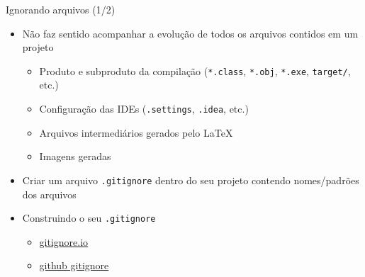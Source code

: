 \documentclass[14pt]{beamer}
\begin{document}
\begin{frame}{Ignorando arquivos (1/2)}
    \begin{itemize}
        \item Não faz sentido acompanhar a evolução de todos os arquivos
        contidos em um projeto
        \begin{itemize}
            \item Produto e subproduto da compilação (\texttt{*.class},
            \texttt{*.obj}, \texttt{*.exe}, \texttt{target/}, etc.)
            \item Configuração das IDEs (\texttt{.settings}, \texttt{.idea},
            etc.)
            \item Arquivos intermediários gerados pelo \LaTeX
            \item Imagens geradas
        \end{itemize}
        \item Criar um arquivo \texttt{.gitignore} dentro do seu projeto
        contendo nomes/padrões dos arquivos
        \item Construindo o seu \texttt{.gitignore}
        \begin{itemize}
            \item \href{https://gitignore.io}{gitignore.io}
            \item \href{https://github.com/github/gitignore}{github gitignore}
            \end{itemize}
    \end{itemize}
\end{frame}
\end{document}

